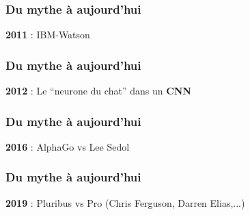 \begin{frame}
  \frametitle{Du mythe à aujourd'hui}
  \textbf{2011} : IBM-Watson
\end{frame}

\begin{frame}
  \frametitle{Du mythe à aujourd'hui}
  \textbf{2012} : Le ``neurone du chat'' dans un \textbf{CNN}
\end{frame}

\begin{frame}
  \frametitle{Du mythe à aujourd'hui}
  \textbf{2016} : AlphaGo vs Lee Sedol
\end{frame}

\begin{frame}
  \frametitle{Du mythe à aujourd'hui}
  \textbf{2019} : Pluribus vs Pro (Chris Ferguson, Darren Elias,...)
\end{frame}

